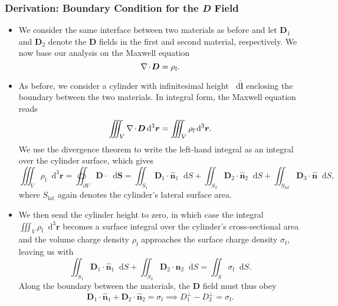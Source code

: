 \documentclass[11pt, a4paper]{article}
\newcommand{\diff}{\mathop{}\!\mathrm{d}} %
\newcommand{\dr}{\diff^{3} \r}  %
\renewcommand{\vec}[1]{\bm{#1}} %
\newcommand{\uvec}[1]{\hat{\vec{#1}}} %
\renewcommand{\r}{\vec{r}}
\newcommand{\D}{\vec{D}}  %
\renewcommand{\div}{\nabla \mspace{-2mu} \cdot \mspace{-2mu}}
\begin{document}
\subsubsection{Derivation: Boundary Condition for the \textit{D} Field}
\begin{itemize}
	\item We consider the same interface between two materials as before and let $ \D_{1} $ and $ \D_{2} $ denote the $ \D $ fields in the first and second material, respectively. We now base our analysis on the Maxwell equation
	\begin{equation*}
		\div \D = \rho_{\text{f}}.
	\end{equation*}
	
	\item As before, we consider a cylinder with infinitesimal height $ \diff \uvec{l} $ enclosing the boundary between the two materials. In integral form, the Maxwell equation reads
	\begin{equation*}
		\iiint_{V} \div \D \dr = \iiint_{V}\rho_{\text{f}}\dr.
	\end{equation*}
	We use the divergence theorem to write the left-hand integral as an integral over the cylinder surface, which gives
    \begin{equation*}
        \iiint_{V} \rho_{\text{f}} \dr = \oiint_{\partial V} \D \cdot \diff \vec{S} = \iint_{S_{1}}\D_{1} \cdot \uvec{n}_{1}\diff S +  \iint_{S_{2}}\D_{2} \cdot \uvec{n}_{2}\diff S +  \iint_{S_{\text{lat}}}\D_{3} \cdot \uvec{n}\diff S,
    \end{equation*}
	where $ S_{\text{lat}} $ again denotes the cylinder's lateral surface area. 
    
    \item We then send the cylinder height to zero, in which case the integral $ \iiint_{V}\rho_{\text{f}}\dr $ becomes a surface integral over the cylinder's cross-sectional area and the volume charge density $ \rho_{\text{f}} $ approaches the surface charge density $ \sigma_{\text{f}} $, leaving us with
	\begin{equation*}
		 \iint_{S_{1}}\D_{1} \cdot \uvec{n}_{1}\diff S +  \iint_{S_{2}}\D_{2} \cdot \uvec{n}_{2}\diff S = \iint_{S}\sigma_{\text{f}} \diff S.
	\end{equation*}
    Along the boundary between the materials, the $ \D $ field must thus obey
	\begin{equation*}
        \D_{1} \cdot \uvec{n}_{1} + \D_{2} \cdot \uvec{n}_{2} = \sigma_{\text{f}} \implies D_{1}^{\perp} - D_{2}^{\perp} = \sigma_{\text{f}}.
	\end{equation*}
	
\end{itemize}
\end{document}
